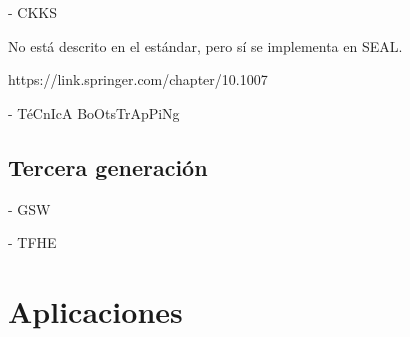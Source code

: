 
- CKKS

No está descrito en el estándar, pero sí se implementa en SEAL.

https://link.springer.com/chapter/10.1007%

- TéCnIcA BoOtsTrApPiNg


\subsection{Tercera generación}

- GSW



- TFHE



\section{Aplicaciones}
